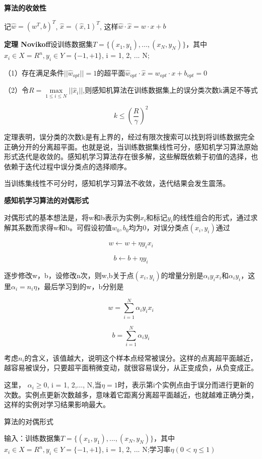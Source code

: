 \documentclass{ctexart}
\begin{document}
	\textbf{算法的收敛性}
	
	记\(\hat{w} = (w^T, b)^T\), \(\hat{x} = (\hat{x}, 1)^T\), 这样\(\hat{w} · \hat{x} = w·x + b\)
	
	\textbf{定理 Novikoff}设训练数据集\(T = \{(x_1, y_1),..., (x_N, y_N)\}\)，其中\(x_i \in X = R^n, y_i \in Y = \{-1, +1\}\), i = 1, 2, ... N;
	
	（1）存在满足条件\(||\hat{w}_{opt}|| = 1\)的超平面\(\hat{w}_{opt} · \hat{x} = w_{opt} · x + b_{opt} = 0\)
	
	（2）令\(R = \max\limits_{1 \leq i \leq N} ||\hat{x}_i||\),则感知机算法在训练数据集上的误分类次数k满足不等式
	
	\[k \leq (\frac{R}{\gamma})^2\]
	
	定理表明，误分类的次数k是有上界的，经过有限次搜索可以找到将训练数据完全正确分开的分离超平面。也就是说，当训练数据集线性可分，感知机学习算法原始形式迭代是收敛的。感知机学习算法存在很多解，这些解既依赖于初值的选择，也依赖于迭代过程中误分类点的选择顺序。
	
	{\color{red}当训练集线性不可分时，感知机学习算法不收敛，迭代结果会发生震荡。}
	
	\textbf{感知机学习算法的对偶形式}
	
	对偶形式的基本想法是，将w和b表示为实例\(x_i\)和标记\(y_i\)的线性组合的形式，通过求解其系数而求得w和b。可假设初值\(w_0, b_0\)均为0，对误分类点\((x_i, y_i)\)通过
	
	\[w \leftarrow w + \eta y_ix_i\]
	
	\[b \leftarrow b + \eta y_i\]
	
	逐步修改w，b，设修改n次，则w,b关于点\((x_i, y_i)\)的增量分别是\(\alpha_i y_i x_i\)和\(\alpha_i y_i\)，这里\(\alpha_i = n_i\eta\)，最后学习到的w，b分别是
	
	\[w = \sum_{i=1}^{N} \alpha_i y_i x_i\]
	
	\[b = \sum_{i=1}^{N} \alpha_i y_i\]
	
	考虑\(n_i\)的含义，该值越大，说明这个样本点经常被误分。这样的点离超平面越近，越容易被误分，只要超平面稍微变动，就很容易误分，从正变成负，从负变成正。
	
	这里， \(\alpha_i \geq 0\), i = 1, 2,..., N,当\(\eta = 1\)时，表示第i个实例点由于误分而进行更新的次数。实例点更新次数越多，意味着它距离分离超平面越近，也就越难正确分类，这样的实例对学习结果影响最大。
	
	算法的对偶形式
	
	输入：训练数据集\(T = \{(x_1, y_1),..., (x_N, y_N)\}\)，其中\(x_i \in X = R^n, y_i \in Y = \{-1, +1\}\), i = 1, 2, ... N;学习率\(\eta (0 < \eta \leq 1)\)
	
\end{document}
